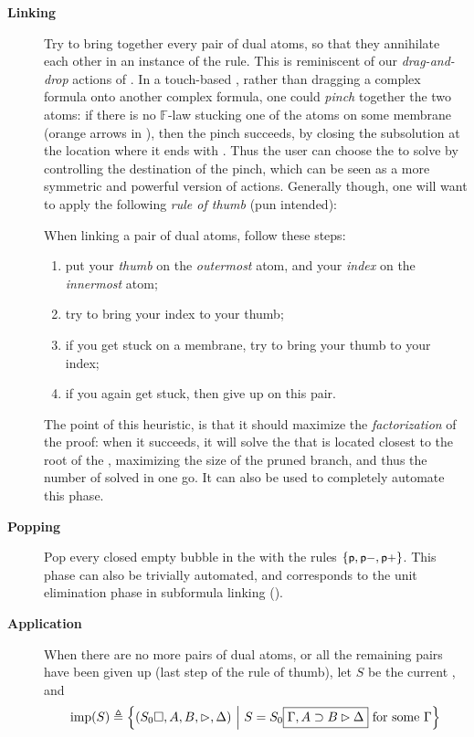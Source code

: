 \begin{description}
  \item[\textbf{Linking}] Try to bring together every pair of dual atoms, so
    that they annihilate each other in an instance of the 
    rule. This is reminiscent of our \emph{drag-and-drop} actions of
    . In a touch-based , rather than dragging a complex formula
    onto another complex formula, one could \emph{pinch} together the two atoms:
    if there is no $\mathbb{F}$-law stucking one of the atoms on some membrane
    (orange arrows in ), then the pinch succeeds, by
    closing the subsolution at the location where it ends with
    . Thus the user can choose the  to solve by
    controlling the destination of the pinch, which can be seen as a more
    symmetric and powerful version of  actions. Generally though, one will
    want to apply the following \emph{rule of thumb} (pun intended):
    \begin{fact}
      When linking a pair of dual atoms, follow these steps:
      \begin{enumerate}
        \item put your \emph{thumb} on the \emph{outermost} atom, and your
              \emph{index} on the \emph{innermost} atom;
        \item try to bring your index to your thumb;
        \item if you get stuck on a membrane, try to bring your thumb to your
              index;
        \item if you again get stuck, then give up on this pair.
      \end{enumerate}
    \end{fact}
    The point of this heuristic, is that it should maximize the
    \emph{factorization} of the proof: when it succeeds, it will solve the
     that is located closest to the root of the , maximizing the size
    of the pruned branch, and thus the number of  solved in one go. It
    can also be used to completely automate this phase.

  \item[\textbf{Popping}] Pop every closed empty bubble in the  with the
  rules $\{\text{\small$\mathsf{p}$},\text{\small$\mathsf{p{-}}$},\text{\small$\mathsf{p{+}}$}\}$. This phase can also be trivially
  automated, and corresponds to the unit elimination phase in subformula linking
  ().

  \item[\textbf{Application}] When there are no more pairs of dual atoms, or all
    the remaining pairs have been given up (last step of the rule of thumb), let
    $S$ be the current , and
    $$\mathrm{imp}(S) \triangleq \left\{(S_0\square, A, B, \mathbin{\rhd}, \Delta) ~\middle|~ S = S_0\fbox{$\Gamma,
          A \supset B \mathbin{\rhd} \Delta$} \text{ for some $\Gamma$}\right\}$$


\end{description}
